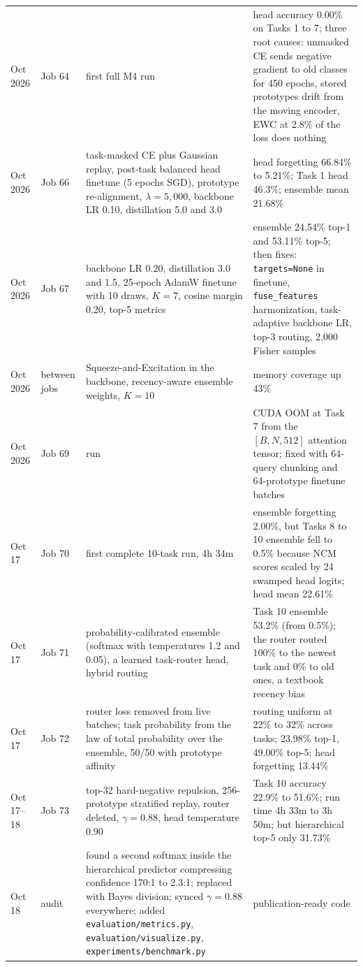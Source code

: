 \documentclass[11pt,a4paper]{article}
\newcommand{\code}[1]{\texttt{#1}}
\begin{document}
\begin{longtable}{L{1.5cm} L{2.2cm} L{6.2cm} L{5.1cm}}
Oct 2026 & Job 64 & first full M4 run & head accuracy 0.00\% on Tasks 1 to 7; three root causes: unmasked CE sends negative gradient to old classes for 450 epochs, stored prototypes drift from the moving encoder, EWC at 2.8\% of the loss does nothing \\
Oct 2026 & Job 66 & task-masked CE plus Gaussian replay, post-task balanced head finetune (5 epochs SGD), prototype re-alignment, $\lambda = 5{,}000$, backbone LR 0.10, distillation 5.0 and 3.0 & head forgetting 66.84\% to 5.21\%; Task 1 head 46.3\%; ensemble mean 21.68\% \\
Oct 2026 & Job 67 & backbone LR 0.20, distillation 3.0 and 1.5, 25-epoch AdamW finetune with 10 draws, $K{=}7$, cosine margin 0.20, top-5 metrics & ensemble 24.54\% top-1 and 53.11\% top-5; then fixes: \code{targets=None} in finetune, \code{fuse\_features} harmonization, task-adaptive backbone LR, top-3 routing, 2{,}000 Fisher samples \\
Oct 2026 & between jobs & Squeeze-and-Excitation in the backbone, recency-aware ensemble weights, $K{=}10$ & memory coverage up 43\% \\
Oct 2026 & Job 69 & run & CUDA OOM at Task 7 from the $[B, N, 512]$ attention tensor; fixed with 64-query chunking and 64-prototype finetune batches \\
Oct 17 & Job 70 & first complete 10-task run, 4h 34m & ensemble forgetting 2.00\%, but Tasks 8 to 10 ensemble fell to 0.5\% because NCM scores scaled by 24 swamped head logits; head mean 22.61\% \\
Oct 17 & Job 71 & probability-calibrated ensemble (softmax with temperatures 1.2 and 0.05), a learned task-router head, hybrid routing & Task 10 ensemble 53.2\% (from 0.5\%); the router routed 100\% to the newest task and 0\% to old ones, a textbook recency bias \\
Oct 17 & Job 72 & router loss removed from live batches; task probability from the law of total probability over the ensemble, 50/50 with prototype affinity & routing uniform at 22\% to 32\% across tasks; 23.98\% top-1, 49.00\% top-5; head forgetting 13.44\% \\
Oct 17--18 & Job 73 & top-32 hard-negative repulsion, 256-prototype stratified replay, router deleted, $\gamma = 0.88$, head temperature 0.90 & Task 10 accuracy 22.9\% to 51.6\%; run time 4h 33m to 3h 50m; but hierarchical top-5 only 31.73\% \\
Oct 18 & audit & found a second softmax inside the hierarchical predictor compressing confidence 170:1 to 2.3:1; replaced with Bayes division; synced $\gamma = 0.88$ everywhere; added \code{evaluation/metrics.py}, \code{evaluation/visualize.py}, \code{experiments/benchmark.py} & publication-ready code \\

\end{longtable}
\end{document}
